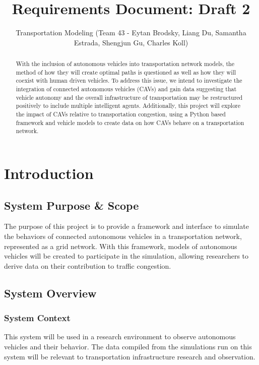 \documentclass[10pt,letterpaper,draftclsnofoot,onecolumn]{IEEEtran}
\begin{document}
\author{Transportation Modeling (Team 43 - Eytan Brodsky, Liang Du, Samantha Estrada, Shengjun Gu, Charles Koll)}
\title{Requirements Document: Draft 2}

\maketitle

\begin{abstract}
With the inclusion of autonomous vehicles into transportation network models, the method of how they will create optimal paths is questioned as well as how they will coexist with human driven vehicles. To address this issue, we intend to investigate the integration of connected autonomous vehicles (CAVs) and gain data suggesting that vehicle autonomy and the overall infrastructure of transportation may be restructured positively to include multiple intelligent agents. Additionally, this project will explore the impact of CAVs relative to transportation congestion, using a Python based framework and vehicle models to create data on how CAVs behave on a transportation network.
\end{abstract}

\pagebreak

\section{Introduction}
	\subsection{System Purpose \& Scope}
	The purpose of this project is to provide a framework and interface to simulate the behaviors of connected autonomous vehicles in a transportation network, represented as a grid network. With this framework, models of autonomous vehicles will be created to participate in the simulation, allowing researchers to derive data on their contribution to traffic congestion.
	\subsection{System Overview}
		\subsubsection{System Context}
		This system will be used in a research environment to observe autonomous vehicles and their behavior. The data compiled from the simulations run on this system will be relevant to transportation infrastructure research and observation.
\end{document}
